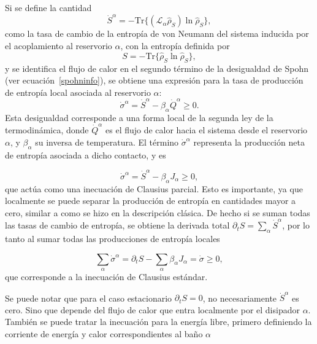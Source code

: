 Si se define la cantidad
\begin{equation}
    \dot{S}^{\alpha} = - \mathrm{Tr} \{ (\mathcal{L}_{\alpha} \hat{\rho}_S) \ln \hat{\rho}_S \},
\end{equation}
como la tasa de cambio de la entropía de von Neumann del sistema inducida por el acoplamiento al reservorio $\alpha$, con la entropía definida por
\begin{equation}
    S = - \mathrm{Tr} \{ \hat{\rho}_S \ln \hat{\rho}_S \},
\end{equation}
y se identifica el flujo de calor en el segundo término de la desigualdad de Spohn (ver ecuación~\ref{spohninfo}), se obtiene una expresión para la tasa de producción de entropía local asociada al reservorio $\alpha$:
\begin{equation}
    \dot{\sigma}^{\alpha} = \dot{S}^{\alpha} - \beta_{\alpha} \dot{Q}^{\alpha} \geq 0.
\end{equation}
Esta desigualdad corresponde a una forma local de la segunda ley de la termodinámica, donde $\dot{Q}^{\alpha}$ es el flujo de calor hacia el sistema desde el reservorio $\alpha$, y $\beta_{\alpha}$ su inversa de temperatura. El término $\dot{\sigma}^{\alpha}$ representa la producción neta de entropía asociada a dicho contacto, y es 

\begin{equation}
    \dot{\sigma}^{\alpha} = \dot{S}^{\alpha} - \beta_{\alpha} J_{\alpha} \geq 0,
\label{sec4:localentropy}
\end{equation}
que actúa como una inecuación de Clausius parcial. Esto es importante, ya que localmente se puede separar la producción de entropía en cantidades mayor a cero, similar a como se hizo en la descripción clásica. De hecho si se suman todas las tasas de cambio de entropía, se obtiene la derivada total $\partial_{t} S = \sum_{\alpha} \dot{S}^{\alpha}$, por lo tanto al sumar todas las producciones de entropía locales

\begin{equation*}
    \sum_{\alpha}\dot{\sigma}^{\alpha} = \partial_{t}S - \sum_{\alpha}\beta_{\alpha}J_{\alpha} = \dot{\sigma} \geq 0,
\end{equation*}
que corresponde a la inecuación de Clausius estándar.

Se puede notar que para el caso estacionario $\partial_{t}S = 0$, no necesariamente $\dot{S}^{\alpha}$ es cero. Sino que depende del flujo de calor que entra localmente por el disipador $\alpha$. También se puede tratar la inecuación para la energía libre, primero definiendo la corriente de energía y calor correspondientes al baño $\alpha$

